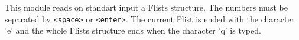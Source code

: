 This module reads 
on standart input a Flists structure. The numbers 
must be separated by \verb+<space>+ or \verb+<enter>+. The current Flist
is ended with the character 'e' and the whole Flists structure ends when
the character 'q' is typed. 

